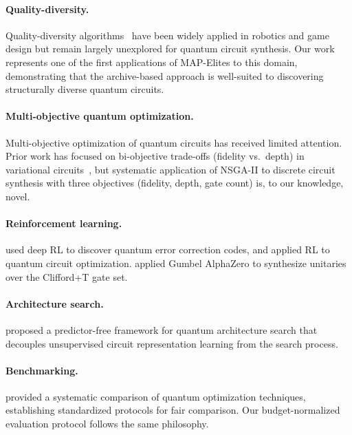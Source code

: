 \documentclass[twocolumn,11pt]{article}
\begin{document}
\paragraph{Quality-diversity.}
Quality-diversity algorithms~\cite{mouret2015illuminating, pugh2016quality}
have been widely applied in robotics and game design but remain largely
unexplored for quantum circuit synthesis.  Our work represents one of the first
applications of MAP-Elites to this domain, demonstrating that the
archive-based approach is well-suited to discovering structurally diverse
quantum circuits.

\paragraph{Multi-objective quantum optimization.}
Multi-objective optimization of quantum circuits has received limited attention.
Prior work has focused on bi-objective trade-offs (fidelity vs.\ depth) in
variational circuits~\cite{cerezo2021variational}, but systematic application
of NSGA-II to discrete circuit synthesis with three objectives (fidelity,
depth, gate count) is, to our knowledge, novel.

\paragraph{Reinforcement learning.}
\citet{fosel2021quantum} used deep RL to discover quantum error correction
codes, and \citet{moro2021quantum} applied RL to quantum circuit
optimization.  \citet{rietsch2024unitary} applied Gumbel AlphaZero to
synthesize unitaries over the Clifford+T gate set.

\paragraph{Architecture search.}
\citet{sun2026qas} proposed a predictor-free framework for quantum
architecture search that decouples unsupervised circuit representation
learning from the search process.

\paragraph{Benchmarking.}
\citet{sharma2025comparative} provided a systematic comparison of quantum
optimization techniques, establishing standardized protocols for fair
comparison.  Our budget-normalized evaluation protocol follows the same
philosophy.

\end{document}
